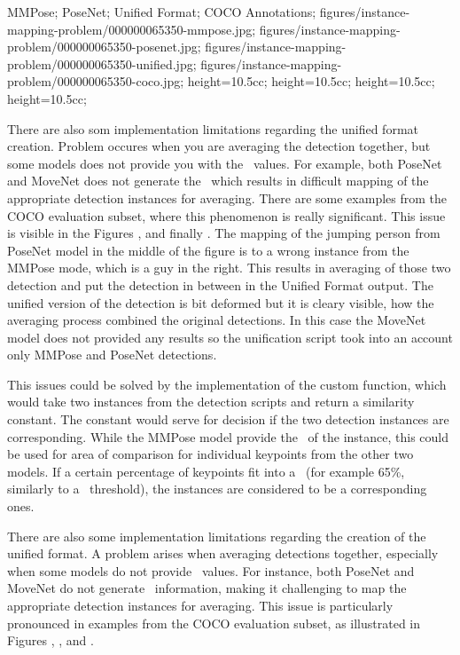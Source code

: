     {
        MMPose;
        PoseNet;
        Unified Format;
        COCO Annotations;
    }
    {
        figures/instance-mapping-problem/000000065350-mmpose.jpg;
        figures/instance-mapping-problem/000000065350-posenet.jpg;
        figures/instance-mapping-problem/000000065350-unified.jpg;
        figures/instance-mapping-problem/000000065350-coco.jpg;
    }
    {
        height=10.5cc;
        height=10.5cc;
        height=10.5cc;
        height=10.5cc;
    }

There are also som implementation limitations regarding the unified format creation. Problem occures when you are averaging the detection together, but some models does not provide you with the \BBOX\ values. For example, both PoseNet and MoveNet does not generate the \BBOX\ which results in difficult mapping of the appropriate detection instances for averaging. There are some examples from the COCO evaluation subset, where this phenomenon is really significant. This issue is visible in the Figures ,  and finally . The mapping of the jumping person from PoseNet model in the middle of the figure is to a wrong instance from the MMPose mode, which is a guy in the right. This results in averaging of those two detection and put the detection in between in the Unified Format output. The unified version of the detection is bit deformed but it is cleary visible, how the averaging process combined the original detections. In this case the MoveNet model does not provided any results so the unification script took into an account only MMPose and PoseNet detections.

This issues could be solved by the implementation of the custom function, which would take two instances from the detection scripts and return a similarity constant. The constant would serve for decision if the two detection instances are corresponding. While the MMPose model provide the \BBOX\ of the instance, this could be used for area of comparison for individual keypoints from the other two models. If a certain percentage of keypoints fit into a \BBOX\ (for example 65\%, similarly to a \IoU\ threshold), the instances are considered to be a corresponding ones.

There are also some implementation limitations regarding the creation of the unified format. A problem arises when averaging detections together, especially when some models do not provide \BBOX\ values. For instance, both PoseNet and MoveNet do not generate \BBOX\ information, making it challenging to map the appropriate detection instances for averaging. This issue is particularly pronounced in examples from the COCO evaluation subset, as illustrated in Figures , , and .

